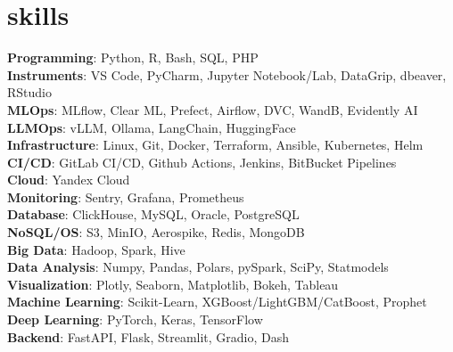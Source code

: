 \section{skills}
\begin{itemize}[leftmargin=0.15in, label={}]
  {\item{
        \textbf{Programming}{: Python, R, Bash, SQL, PHP} \\
        \textbf{Instruments}{: VS Code, PyCharm, Jupyter Notebook/Lab, DataGrip, dbeaver, RStudio} \\
        \textbf{MLOps}{: MLflow, Clear ML, Prefect, Airflow, DVC, WandB, Evidently AI} \\
        \textbf{LLMOps}{: vLLM, Ollama, LangChain, HuggingFace} \\
        \textbf{Infrastructure}{: Linux, Git, Docker, Terraform, Ansible, Kubernetes, Helm} \\
        \textbf{CI/CD}{: GitLab CI/CD, Github Actions, Jenkins, BitBucket Pipelines} \\
        \textbf{Cloud}{: Yandex Cloud} \\
        \textbf{Monitoring}{: Sentry, Grafana, Prometheus} \\
        \textbf{Database}{: ClickHouse, MySQL, Oracle, PostgreSQL} \\
        \textbf{NoSQL/OS}{: S3, MinIO, Aerospike, Redis, MongoDB} \\
        \textbf{Big Data}{: Hadoop, Spark, Hive} \\
        \textbf{Data Analysis}{: Numpy, Pandas, Polars, pySpark, SciPy, Statmodels} \\
        \textbf{Visualization}{: Plotly, Seaborn, Matplotlib, Bokeh, Tableau} \\
        \textbf{Machine Learning}{: Scikit-Learn, XGBoost/LightGBM/CatBoost, Prophet} \\
        \textbf{Deep Learning}{: PyTorch, Keras, TensorFlow} \\
        \textbf{Backend}{: FastAPI, Flask, Streamlit, Gradio, Dash} \\
        }}
\end{itemize}